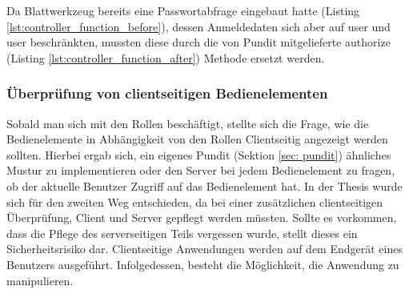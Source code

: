 \begin{minipage}{\textwidth}
	
\end{minipage}

Da Blattwerkzeug bereits eine Passwortabfrage eingebaut hatte (Listing \ref{lst:controller_function_before}), dessen Anmeldedaten sich aber auf user und user beschränkten, mussten diese durch die von Pundit mitgelieferte authorize (Listing \ref{lst:controller_function_after}) Methode ersetzt werden.

\begin{minipage}{\linewidth}
	
\end{minipage}

\begin{minipage}{\linewidth}
	
\end{minipage}

\subsubsection{Überprüfung von clientseitigen Bedienelementen}
\label{sec:server-may-perform}
Sobald man sich mit den Rollen beschäftigt, stellte sich die Frage, wie die Bedienelemente in Abhängigkeit von den Rollen Clientseitig angezeigt werden sollten. Hierbei ergab sich, ein eigenes Pundit (Sektion \ref{sec: pundit}) ähnliches Mustur zu implementieren oder den Server bei jedem Bedienelement zu fragen, ob der aktuelle Benutzer Zugriff auf das Bedienelement hat. In der Thesis wurde sich für den zweiten Weg entschieden, da bei einer zusätzlichen clientseitigen Überprüfung, Client und Server gepflegt werden müssten. Sollte es vorkommen, dass die Pflege des serverseitigen Teils vergessen wurde, stellt dieses ein Sicherheitsrisiko dar. Clientseitige Anwendungen werden auf dem Endgerät eines Benutzers ausgeführt. Infolgedessen, besteht die Möglichkeit, die Anwendung zu manipulieren.

